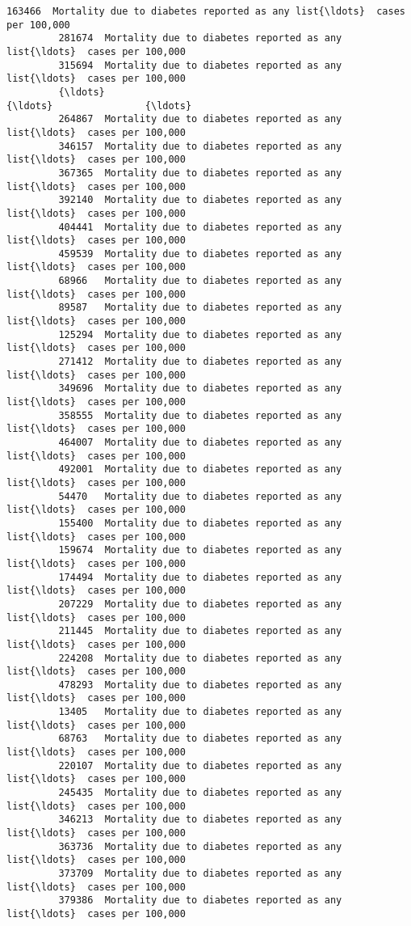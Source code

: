 \documentclass[11pt]{article}
\begin{document}
\begin{Verbatim}[commandchars=\\\{\}]
         163466  Mortality due to diabetes reported as any list{\ldots}  cases per 100,000   
         281674  Mortality due to diabetes reported as any list{\ldots}  cases per 100,000   
         315694  Mortality due to diabetes reported as any list{\ldots}  cases per 100,000   
         {\ldots}                                                   {\ldots}                {\ldots}   
         264867  Mortality due to diabetes reported as any list{\ldots}  cases per 100,000   
         346157  Mortality due to diabetes reported as any list{\ldots}  cases per 100,000   
         367365  Mortality due to diabetes reported as any list{\ldots}  cases per 100,000   
         392140  Mortality due to diabetes reported as any list{\ldots}  cases per 100,000   
         404441  Mortality due to diabetes reported as any list{\ldots}  cases per 100,000   
         459539  Mortality due to diabetes reported as any list{\ldots}  cases per 100,000   
         68966   Mortality due to diabetes reported as any list{\ldots}  cases per 100,000   
         89587   Mortality due to diabetes reported as any list{\ldots}  cases per 100,000   
         125294  Mortality due to diabetes reported as any list{\ldots}  cases per 100,000   
         271412  Mortality due to diabetes reported as any list{\ldots}  cases per 100,000   
         349696  Mortality due to diabetes reported as any list{\ldots}  cases per 100,000   
         358555  Mortality due to diabetes reported as any list{\ldots}  cases per 100,000   
         464007  Mortality due to diabetes reported as any list{\ldots}  cases per 100,000   
         492001  Mortality due to diabetes reported as any list{\ldots}  cases per 100,000   
         54470   Mortality due to diabetes reported as any list{\ldots}  cases per 100,000   
         155400  Mortality due to diabetes reported as any list{\ldots}  cases per 100,000   
         159674  Mortality due to diabetes reported as any list{\ldots}  cases per 100,000   
         174494  Mortality due to diabetes reported as any list{\ldots}  cases per 100,000   
         207229  Mortality due to diabetes reported as any list{\ldots}  cases per 100,000   
         211445  Mortality due to diabetes reported as any list{\ldots}  cases per 100,000   
         224208  Mortality due to diabetes reported as any list{\ldots}  cases per 100,000   
         478293  Mortality due to diabetes reported as any list{\ldots}  cases per 100,000   
         13405   Mortality due to diabetes reported as any list{\ldots}  cases per 100,000   
         68763   Mortality due to diabetes reported as any list{\ldots}  cases per 100,000   
         220107  Mortality due to diabetes reported as any list{\ldots}  cases per 100,000   
         245435  Mortality due to diabetes reported as any list{\ldots}  cases per 100,000   
         346213  Mortality due to diabetes reported as any list{\ldots}  cases per 100,000   
         363736  Mortality due to diabetes reported as any list{\ldots}  cases per 100,000   
         373709  Mortality due to diabetes reported as any list{\ldots}  cases per 100,000   
         379386  Mortality due to diabetes reported as any list{\ldots}  cases per 100,000   
         

\end{Verbatim}
\end{document}
